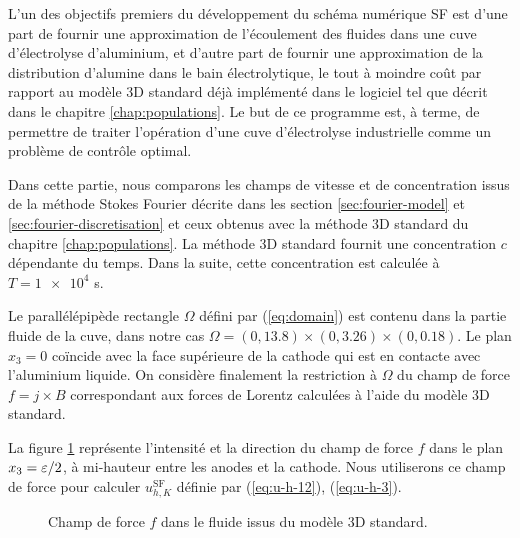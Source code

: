L'un des objectifs premiers du développement du schéma numérique
SF est d'une part de fournir une approximation de l'écoulement des
fluides dans une cuve d'électrolyse d'aluminium, et d'autre part
de fournir une approximation de la distribution d'alumine dans le bain
électrolytique, le tout à moindre coût par rapport au modèle
3D standard déjà implémenté dans le logiciel \citealucell{} tel que décrit
dans le chapitre \ref{chap:populations}. Le but de ce programme est,
à terme, de permettre de traiter l'opération d'une cuve
d'électrolyse industrielle comme un problème de contrôle optimal.

Dans cette partie, nous comparons les champs de vitesse et de
concentration issus de la méthode Stokes Fourier décrite dans les
section \ref{sec:fourier-model} et \ref{sec:fourier-discretisation} et
ceux obtenus avec la méthode 3D standard du chapitre
\ref{chap:populations}. La méthode 3D standard fournit une
concentration $c$ dépendante du temps. Dans la suite, cette
concentration est calculée à $T = \num{1e4}$ \si{\second}.

Le parallélépipède rectangle $\Omega$ défini par (\ref{eq:domain}) est
contenu dans la partie fluide de la cuve, dans notre cas $\Omega = (0,
\num{13.8})\times(0,\num{3.26})\times(0,\num{0.18})$. Le plan $x_3 =
0$ coïncide avec la face supérieure de la cathode qui est en contacte
avec l'aluminium liquide. On considère finalement la restriction à
$\Omega$ du champ de force $f = j\times B$ correspondant aux forces de
Lorentz calculées à l'aide du modèle 3D standard.

La figure \ref{fig:harmonic-force-h} représente l'intensité et la
direction du champ de force $f$ dans le plan $x_3 = \varepsilon / 2$,
à mi-hauteur entre les anodes et la cathode. Nous utiliserons ce champ
de force pour calculer $u_{h,K}^\mathrm{SF}$ définie par
(\ref{eq:u-h-12}), (\ref{eq:u-h-3}).

\begin{figure}[h!]
  \begin{center}
    \caption{Champ de force $f$ dans le fluide issus du modèle 3D standard.}
    \label{fig:harmonic-force-h}
  \end{center}
\end{figure}

